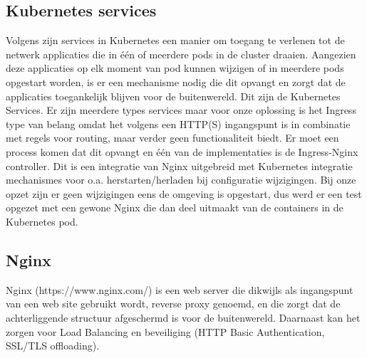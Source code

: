 \subsection{Kubernetes services}
Volgens \textcite{Kubernetes2023b} zijn services in Kubernetes een manier om toegang te verlenen tot de netwerk applicaties die in één of meerdere pods in de cluster draaien.
\newline
Aangezien deze applicaties op elk moment van pod kunnen wijzigen of in meerdere pods opgestart worden, is er een mechanisme nodig die dit opvangt en zorgt dat de applicaties toegankelijk blijven voor de buitenwereld. Dit zijn de Kubernetes Services.
\newline
Er zijn meerdere types services maar voor onze oplossing is het Ingress type van belang omdat het volgens \autocite{Kubernetes2023d} een HTTP(S) ingangspunt is in combinatie met regels voor routing, maar verder geen functionaliteit biedt. Er moet een process komen dat dit opvangt en \'e\'en van de implementaties is de Ingress-Nginx controller. Dit is een integratie van Nginx uitgebreid met Kubernetes integratie mechanismes voor o.a. herstarten/herladen bij configuratie wijzigingen. Bij onze opzet zijn er geen wijzigingen eens de omgeving is opgestart, dus werd er een test opgezet met een gewone Nginx die dan deel uitmaakt van de containers in de Kubernetes pod.

\subsection{Nginx}
Nginx (https://www.nginx.com/) is een web server die dikwijls als ingangspunt van een web site gebruikt wordt, reverse proxy genoemd, en die zorgt dat de achterliggende structuur afgeschermd is voor de buitenwereld. Daarnaast kan het zorgen voor Load Balancing en beveiliging (HTTP Basic Authentication, SSL/TLS offloading).



